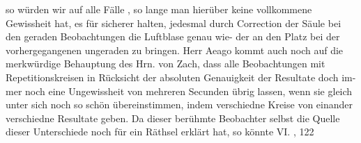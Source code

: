 \documentclass[12pt,a4paper]{article}
\begin{document}
so würden wir auf alle Fälle , so lange man hierüber keine vollkommene Gewissheit hat, es für sicherer\newline
halten, jedesmal durch Correction der Säule bei den geraden Beobachtungen die Luftblase genau wie-\newline
der an den Platz bei der vorhergegangenen ungeraden zu bringen.\newline
Herr Aeago kommt auch noch auf die merkwürdige Behauptung des Hrn. von Zach, dass alle\newline
Beobachtungen mit Repetitionskreisen in Rücksicht der absoluten Genauigkeit der Resultate doch im-\newline
mer noch eine Ungewissheit von mehreren Secunden übrig lassen, wenn sie gleich unter sich noch so\newline
schön übereinstimmen, indem verschiedne Kreise von einander verschiedne Resultate geben. Da dieser\newline
berühmte Beobachter selbst die Quelle dieser Unterschiede noch für ein Räthsel erklärt hat, so könnte\newline
VI. , 122\newline
\end{document}
